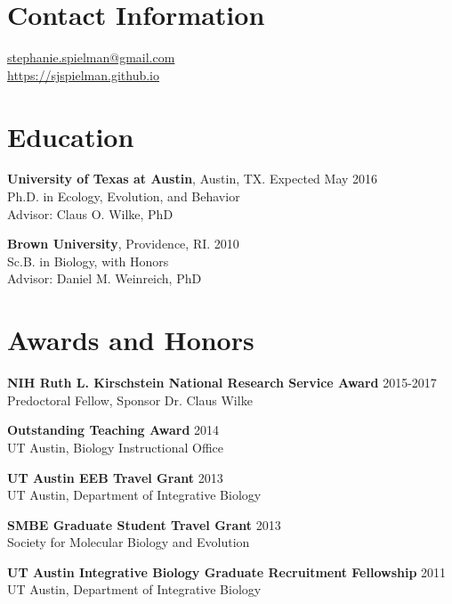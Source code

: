 \documentclass[line, margin]{res}
\begin{document}


\begin{resume}
\vspace{0.5cm}
\section{Contact Information}
	\href{mailto:stephanie.spielman@gmail.com}{stephanie.spielman@gmail.com} \\
	\url{https://sjspielman.github.io}
	
\vspace{0.75cm}
	
\section{Education}

\textbf{University of Texas at Austin}, Austin, TX. \hfill Expected May 2016 \\ Ph.D. in Ecology, Evolution, and Behavior \\ Advisor: Claus O. Wilke, PhD


\textbf{Brown University}, Providence, RI.  \hfill 2010 \\ Sc.B. in Biology, with Honors \\ Advisor: Daniel M. Weinreich, PhD

\vspace{0.75cm}

\section{Awards and Honors}

\textbf{NIH Ruth L. Kirschstein National Research Service Award} \hfill 2015-2017 \\ Predoctoral Fellow, Sponsor Dr. Claus Wilke

\textbf{Outstanding Teaching Award} \hfill 2014 \\ UT Austin, Biology Instructional Office

\textbf{UT Austin EEB Travel Grant} \hfill 2013 \\ UT Austin, Department of Integrative Biology

\textbf{SMBE Graduate Student Travel Grant} \hfill 2013 \\ Society for Molecular Biology and Evolution

\textbf{UT Austin Integrative Biology Graduate Recruitment Fellowship} \hfill 2011 \\ UT Austin, Department of Integrative Biology


\end{resume}
\end{document}
